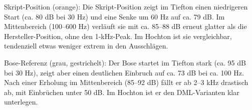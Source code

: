Skript-Position (orange):
Die Skript-Position zeigt im Tiefton einen niedrigeren Start (ca. 80 dB bei 30 Hz) und eine Senke um 60 Hz auf ca. 79 dB. Im Mittenbereich (100--600 Hz) verläuft sie mit ca. 85--88 dB erneut glatter als die Hersteller-Position, ohne den 1-kHz-Peak. Im Hochton ist sie vergleichbar, tendenziell etwas weniger extrem in den Ausschlägen.

Bose-Referenz (grau, gestrichelt):
Der Bose startet im Tiefton stark (ca. 95 dB bei 30 Hz), zeigt aber einen deutlichen Einbruch auf ca. 73 dB bei ca. 100 Hz. Nach einer Erholung im Mittenbereich (85--92 dB) fällt er ab 2--3 kHz drastisch ab, mit Einbrüchen unter 50 dB. Im Hochton ist er den DML-Varianten klar unterlegen.





\begin{figure}[H]
    \centering
\end{figure}
